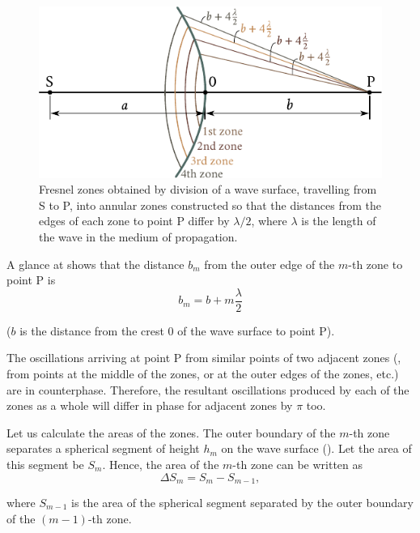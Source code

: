 \begin{figure}[!htb]
	\begin{center}
		\includegraphics[scale=1]{figures/ch_18/fig_18_4.pdf}
        \caption[]{Fresnel zones obtained by division of a wave surface, travelling from S to P,  into annular zones constructed so that the distances from the edges of each zone to point P differ by $\lambda/2$, where $\lambda$ is the length of the wave in the medium of propagation.}
		\label{fig:18_4}
	\end{center}
	\vspace{-0.8cm}
\end{figure}

A glance at  shows that the distance $b_m$ from the outer edge of the $m$-th zone to point P is
\begin{equation}\label{eq:18_4}
    b_m = b + m \frac{\lambda}{2}
\end{equation}

\noindent
($b$ is the distance from the crest $0$ of the wave surface to point P).

The oscillations arriving at point P from similar points of two adjacent zones (\ie, from points at the middle of the zones, or at the outer edges of the zones, etc.) are in counterphase.
Therefore, the resultant oscillations produced by each of the zones as a whole will differ in phase for adjacent zones by $\pi$ too.

Let us calculate the areas of the zones.
The outer boundary of the $m$-th zone separates a spherical segment of height $h_m$ on the wave surface ().
Let the area of this segment be $S_m$.
Hence, the area of the $m$-th zone can be written as
\begin{equation*}
    \Delta{S_m} = S_m - S_{m-1},
\end{equation*}

\noindent
where $S_{m-1}$ is the area of the spherical segment separated by the outer boundary of the $(m-1)$-th zone.

